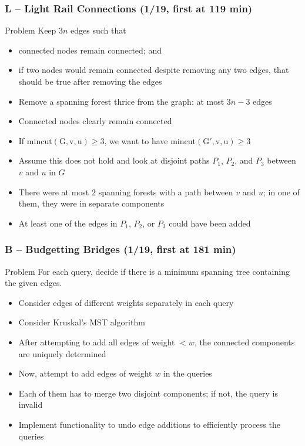 \documentclass{beamer}
\begin{document}
\begin{frame}
\frametitle{L -- Light Rail Connections (1/19, first at 119 min)}
    \begin{block}{Problem}
        Keep $3n$ edges such that
        \begin{itemize}
            \item connected nodes remain connected; and
            \item if two nodes would remain connected despite removing any two edges, that should be true after removing the edges
        \end{itemize}
    \end{block}
    \begin{itemize}
        \item Remove a spanning forest thrice from the graph: at most $3n - 3$ edges
        \item Connected nodes clearly remain connected
        \item If $\mathrm{mincut(G, v, u)} \ge 3$, we want to have $\mathrm{mincut(G', v, u)} \ge 3$
        \item Assume this does not hold and look at disjoint paths $P_1$, $P_2$, and $P_3$ between $v$ and $u$ in $G$
        \item There were at most $2$ spanning forests with a path between $v$ and $u$; in one of them, they were in separate components
        \item At least one of the edges in $P_1$, $P_2$, or $P_3$ could have been added
    \end{itemize}
\end{frame}

\begin{frame}
\frametitle{B -- Budgetting Bridges (1/19, first at 181 min)}
    \begin{block}{Problem}
        For each query, decide if there is a minimum spanning tree containing the given edges.
    \end{block}
    \begin{itemize}
        \item Consider edges of different weights separately in each query
        \item Consider Kruskal's MST algorithm
        \item After attempting to add all edges of weight $< w$, the connected components are uniquely determined
        \item Now, attempt to add edges of weight $w$ in the queries
        \item Each of them has to merge two disjoint components; if not, the query is invalid
        \item Implement functionality to undo edge additions to efficiently process the queries
    \end{itemize}
\end{frame}
\end{document}
